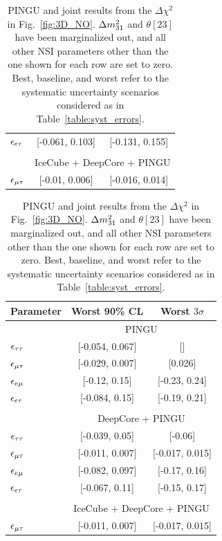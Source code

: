 {{\begin{table}
\begin{tabular}{lcc}
      $\epsilon_{e\tau}$ &   [-0.061, 0.103] &  [-0.131, 0.155] \\\\
      & \multicolumn{2}{c}{IceCube + DeepCore + PINGU}  \\
      $\epsilon_{\mu\tau}$ &   [-0.01, 0.006] &  [-0.016, 0.014] \\
      \hline
   \end{tabular}
   \begin{tabular}{lcc}
      \hline 
      Parameter & Worst 90\% CL & Worst $3\sigma$\\
      \hline & \multicolumn{2}{c}{PINGU} \\
      $\epsilon_{\tau\tau}$ &    [-0.054, 0.067] &               [] \\
      $\epsilon_{\mu\tau}$ &    [-0.029, 0.007] &          [0.026] \\
      $\epsilon_{e\mu}$ &  [-0.12, 0.15] &  [-0.23, 0.24] \\
      $\epsilon_{e\tau}$ &   [-0.084, 0.15] &  [-0.19, 0.21] \\\\
      & \multicolumn{2}{c}{DeepCore + PINGU} \\
      $\epsilon_{\tau\tau}$ &     [-0.039, 0.05] &          [-0.06] \\
      $\epsilon_{\mu\tau}$ &  [-0.011, 0.007] &  [-0.017, 0.015] \\
      $\epsilon_{e\mu}$ &   [-0.082, 0.097] &  [-0.17, 0.16] \\
      $\epsilon_{e\tau}$ &   [-0.067, 0.11] &  [-0.15, 0.17] \\\\
      & \multicolumn{2}{c}{IceCube + DeepCore + PINGU}  \\
      $\epsilon_{\mu\tau}$ &   [-0.011, 0.007] &  [-0.017, 0.015] \\
      \hline
   \end{tabular}
   \caption{PINGU and joint results from the $\Delta \chi^2$ in Fig.~\ref{fig:3D_NO}. $\dm[31]$ and $\theta[23]$ have been marginalized out, and all other NSI parameters other than the one shown for each row are set to zero.
   Best, baseline, and worst refer to 
   the systematic uncertainty scenarios considered as in Table~\ref{table:syst_errors}.}\label{table:PINGU_joint_results}
\end{table}


}}
